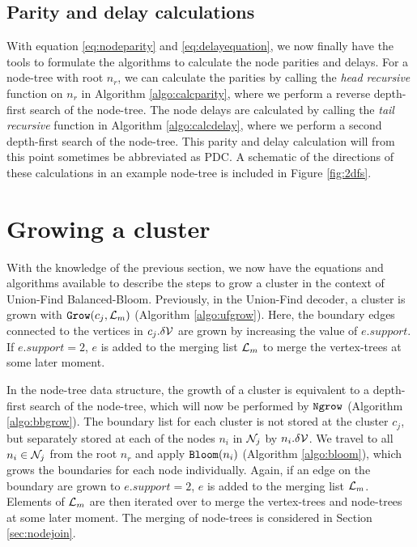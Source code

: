 
 
\subsection{Parity and delay calculations}\label{sec:pdccalc}

With equation \eqref{eq:nodeparity} and \eqref{eq:delayequation}, we now finally have the tools to formulate the algorithms to calculate the node parities and delays. For a node-tree with root $n_r$, we can calculate the parities by calling the \emph{head recursive} function  on $n_r$ in Algorithm \ref{algo:calcparity}, where we perform a reverse depth-first search of the node-tree. The node delays are calculated by calling the \emph{tail recursive} function  in Algorithm \ref{algo:calcdelay}, where we perform a second depth-first search of the node-tree. This parity and delay calculation will from this point sometimes be abbreviated as PDC. A schematic of the directions of these calculations in an example node-tree is included in Figure \ref{fig:2dfs}.





\section{Growing a cluster}\label{sec:growingcluster}
With the knowledge of the previous section, we now have the equations and algorithms available to describe the steps to grow a cluster in the context of Union-Find Balanced-Bloom. Previously, in the Union-Find decoder, a cluster is grown with $\texttt{Grow}(c_j, \mathcal{L}_m)$ (Algorithm \ref{algo:ufgrow}). Here, the boundary edges connected to the vertices in $c_j.\delta\mathcal{V}$ are grown by increasing the value of $e.support$. If $e.support = 2$, $e$ is added to the merging list $\mathcal{L}_m$ to merge the vertex-trees at some later moment. 

In the node-tree data structure, the growth of a cluster is equivalent to a depth-first search of the node-tree, which will now be performed by $\texttt{Ngrow}$ (Algorithm \ref{algo:bbgrow}). The boundary list for each cluster is not stored at the cluster $c_j$, but separately stored at each of the nodes $n_i$ in $\mathcal{N}_j$ by $n_i.\delta\mathcal{V}$. We travel to all $n_i \in \mathcal{N}_j$ from the root $n_r$ and apply $\texttt{Bloom}(n_i)$ (Algorithm \ref{algo:bloom}), which grows the boundaries for each node individually. Again, if an edge on the boundary are grown to $e.support = 2$, $e$ is added to the merging list $\mathcal{L}_m$. Elements of $\mathcal{L}_m$ are then iterated over to merge the vertex-trees and node-trees at some later moment. The merging of node-trees is considered in Section \ref{sec:nodejoin}. 

